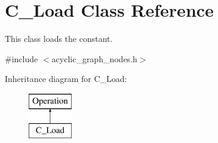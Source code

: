 \hypertarget{classC__Load}{}\section{C\+\_\+\+Load Class Reference}
\label{classC__Load}


This class loads the constant.  




{\ttfamily \#include $<$acyclic\+\_\+graph\+\_\+nodes.\+h$>$}

Inheritance diagram for C\+\_\+\+Load\+:\begin{figure}[H]
\begin{center}
\leavevmode
\includegraphics[height=2.000000cm]{classC__Load}
\end{center}
\end{figure}
